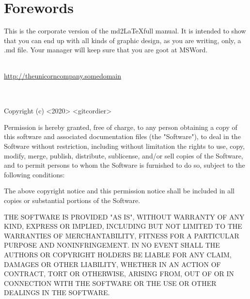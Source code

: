 \section*{Forewords}
This is the corporate version of the md2\LaTeX full manual.
It is intended to show that you can end up with all kinds of graphic design, 
as you are writing, only, a .md file. 
Your manager will keep sure that you are goot at MSWord.


\vspace{7cm}
{\color{corporate_blue}{THE UNICORN COMPANY}}\\
\href{https://github.com/gitcordier}{\underline{http://theunicorncompany.somedomain}}\\
\href{mailto:admin@gcordier.eu}{}\\
\\
{\fw Copyright (c) <2020> <gitcordier>

Permission is hereby granted, free of charge, to any person obtaining a copy
of this software and associated documentation files (the "Software"), to deal
in the Software without restriction, including without limitation the rights
to use, copy, modify, merge, publish, distribute, sublicense, and/or sell
copies of the Software, and to permit persons to whom the Software is
furnished to do so, subject to the following conditions:

The above copyright notice and this permission notice shall be included in all
copies or substantial portions of the Software.

THE SOFTWARE IS PROVIDED "AS IS", WITHOUT WARRANTY OF ANY KIND, EXPRESS OR
IMPLIED, INCLUDING BUT NOT LIMITED TO THE WARRANTIES OF MERCHANTABILITY,
FITNESS FOR A PARTICULAR PURPOSE AND NONINFRINGEMENT. IN NO EVENT SHALL THE
AUTHORS OR COPYRIGHT HOLDERS BE LIABLE FOR ANY CLAIM, DAMAGES OR OTHER
LIABILITY, WHETHER IN AN ACTION OF CONTRACT, TORT OR OTHERWISE, ARISING FROM,
OUT OF OR IN CONNECTION WITH THE SOFTWARE OR THE USE OR OTHER DEALINGS IN THE
SOFTWARE.}
